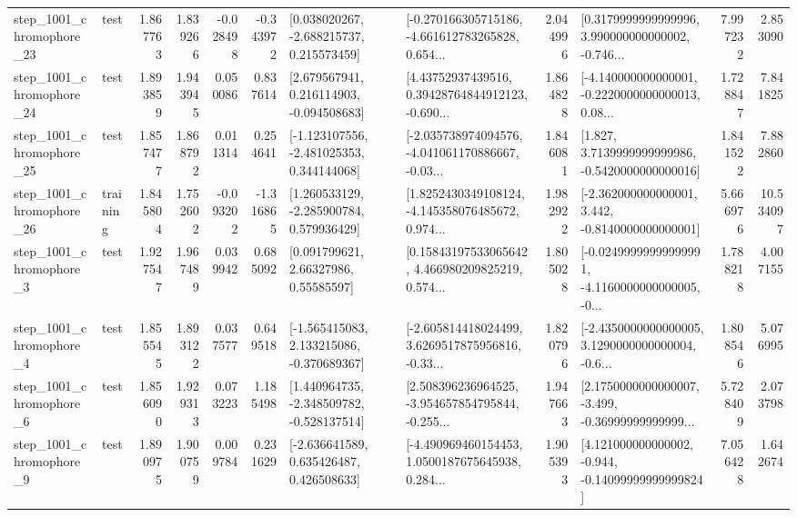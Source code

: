 \begin{tabular}{llrrrrllrlrr}
 step\_1001\_chromophore\_23 &      test &      1.867763 &    1.839266 &     -0.028498 & -0.343972 &    [0.038020267, -2.688215737, 0.215573459] &  [-0.270166305715186, -4.661612783265828, 0.654... &       2.044996 &  [0.3179999999999996, 3.990000000000002, -0.746... &            7.997232 &          2.853090 \\
 step\_1001\_chromophore\_24 &      test &      1.893859 &    1.943945 &      0.050086 &  0.837614 &    [2.679567941, 0.216114903, -0.094508683] &  [4.43752937439516, 0.39428764844912123, -0.690... &       1.864828 &  [-4.140000000000001, -0.2220000000000013, 0.08... &            1.728847 &          7.841825 \\
 step\_1001\_chromophore\_25 &      test &      1.857477 &    1.868792 &      0.011314 &  0.254641 &   [-1.123107556, -2.481025353, 0.344144068] &  [-2.035738974094576, -4.041061170886667, -0.03... &       1.846081 &   [1.827, 3.7139999999999986, -0.5420000000000016] &            1.841522 &          7.882860 \\
 step\_1001\_chromophore\_26 &  training &      1.845804 &    1.752602 &     -0.093202 & -1.316865 &    [1.260533129, -2.285900784, 0.579936429] &  [1.8252430349108124, -4.145358076485672, 0.974... &       1.982922 &   [-2.362000000000001, 3.442, -0.8140000000000001] &            5.666976 &         10.534097 \\
  step\_1001\_chromophore\_3 &      test &      1.927547 &    1.967489 &      0.039942 &  0.685092 &       [0.091799621, 2.66327986, 0.55585597] &  [0.15843197533065642, 4.466980209825219, 0.574... &       1.805028 &  [-0.02499999999999991, -4.1160000000000005, -0... &            1.788218 &          4.007155 \\
  step\_1001\_chromophore\_4 &      test &      1.855545 &    1.893122 &      0.037577 &  0.649518 &   [-1.565415083, 2.133215086, -0.370689367] &  [-2.605814418024499, 3.6269517875956816, -0.33... &       1.820796 &  [-2.4350000000000005, 3.1290000000000004, -0.6... &            1.808546 &          5.076995 \\
  step\_1001\_chromophore\_6 &      test &      1.856090 &    1.929313 &      0.073223 &  1.185498 &   [1.440964735, -2.348509782, -0.528137514] &  [2.508396236964525, -3.954657854795844, -0.255... &       1.947663 &  [2.1750000000000007, -3.499, -0.36999999999999... &            5.728409 &          2.073798 \\
  step\_1001\_chromophore\_9 &      test &      1.890975 &    1.900759 &      0.009784 &  0.231629 &    [-2.636641589, 0.635426487, 0.426508633] &  [-4.490969460154453, 1.0500187675645938, 0.284... &       1.905393 &  [4.121000000000002, -0.944, -0.14099999999999824] &            7.056428 &          1.642674 \\

\end{tabular}
